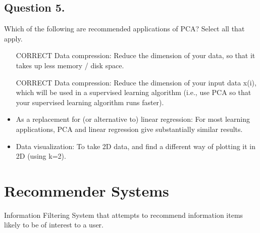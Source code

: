 \subsection{ Question 5. }
Which of the following are recommended applications of PCA? Select all that apply.

\begin{itemize}
\item [CORRECT] Data compression: Reduce the dimension of your data, so that it takes up less memory / disk space.

\item [CORRECT] Data compression: Reduce the dimension of your input data x(i), which will be used in a supervised learning algorithm (i.e., use PCA so that your supervised learning algorithm runs faster).

\item As a replacement for (or alternative to) linear regression: For most learning applications, PCA and linear regression give substantially similar results.

\item Data visualization: To take 2D data, and find a different way of plotting it in 2D (using k=2).

\end{itemize}


\section{Recommender Systems}

Information Filtering System that attempts to recommend information items likely
to be of interest to a user.

